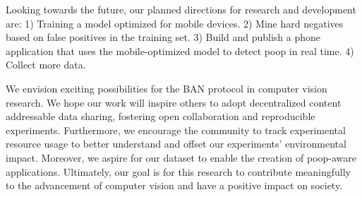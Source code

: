 \documentclass[10pt,twocolumn,letterpaper]{article}
\newif\ifnonanonymous
\newif\ifuseappendix
\newif\ifuseacknowledgement
\begin{document}
Looking towards the future, our planned directions for research and development are:
1) Training a model optimized for mobile devices.
2) Mine hard negatives based on false positives in the training set.
3) Build and publish a phone application that uses the mobile-optimized model to detect poop in real time.
4) Collect more data.

We envision exciting possibilities for the BAN protocol in computer vision research.
We hope our work will inspire others to adopt decentralized content addressable data sharing, fostering open
  collaboration and reproducible experiments.
Furthermore, we encourage the community to track experimental resource usage to better understand and offset
  our experiments' environmental impact.
Moreover, we aspire for our dataset to enable the creation of poop-aware applications.
Ultimately, our goal is for this research to contribute meaningfully to the advancement of computer vision
  and have a positive impact on society.
  
  
\ifnonanonymous
\ifuseacknowledgement
\section{Acknowledgements}
We would would like to thank all of the dogs that produced subject matter for the dataset, all of the
  contributors for helping to construct a challenging test set, and Anthony Hoogs for several suggestions including taking the 
  third negative picture.

\fi
\fi

{\small


}


\ifuseappendix

\fi
\end{document}
